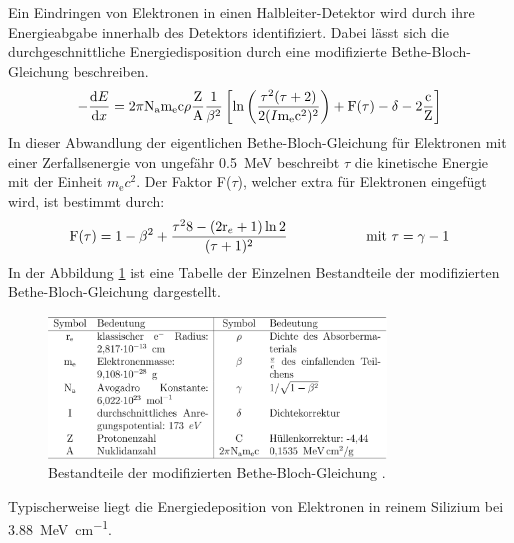 Ein Eindringen von Elektronen in einen Halbleiter-Detektor wird durch
ihre Energieabgabe innerhalb des Detektors identifiziert. Dabei lässt sich die
durchgeschnittliche Energiedisposition durch eine modifizierte Bethe-Bloch-Gleichung
beschreiben.
\begin{equation*}
  -\frac{\text{d}E}{\text{d}x} =
  2\pi \text{N}_\text{a} \text{m}_\text{e} \text{c}\rho \frac{\text{Z}}{\text{A}}\frac{1}{\beta^2}
  \left[\text{ln}\left(\frac{\tau^2(\tau + 2)}{2(I\/\text{m}_\text{e}\text{c}^2)^2}\right)
  + \text{F}(\tau) - \delta - 2\frac{\text{c}}{\text{Z}}\right]
\end{equation*}
In dieser Abwandlung der eigentlichen Bethe-Bloch-Gleichung für Elektronen mit einer
Zerfallsenergie von ungefähr \SI{0.5}{\mega\electronvolt}
beschreibt $\tau$ die kinetische Energie mit der Einheit $m_\text{e} c^2$. Der
Faktor F($\tau$), welcher extra für Elektronen eingefügt wird, ist bestimmt durch:
\begin{equation*}
  \text{F}(\tau) = 1 - \beta^2 + \frac{\tau^2\/8 - (2\text{r}_e + 1) \ln2}{(\tau + 1)^2}
  \hspace{2cm}\text{mit } \tau = \gamma - 1
\end{equation*}
In der Abbildung \ref{fig:tab} ist eine Tabelle der Einzelnen Bestandteile der
modifizierten Bethe-Bloch-Gleichung dargestellt.
\begin{figure}[htb]
  \centering
  \includegraphics[width=0.8\textwidth]{graphics/Tabelle.png}
  \caption{Bestandteile der modifizierten Bethe-Bloch-Gleichung \cite{anleitung}.}
  \label{fig:tab}
\end{figure}
Typischerweise liegt die Energiedeposition von Elektronen in reinem Silizium bei
\SI{3.88}{\mega\electronvolt\per\centi\meter}.

\FloatBarrier
